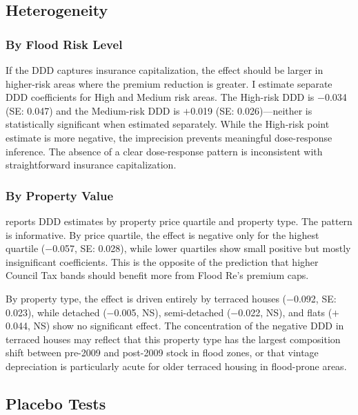\documentclass[12pt]{article}
\begin{document}
\subsection{Heterogeneity}

\subsubsection{By Flood Risk Level}

If the DDD captures insurance capitalization, the effect should be larger in higher-risk areas where the premium reduction is greater. I estimate separate DDD coefficients for High and Medium risk areas. The High-risk DDD is $-$0.034 (SE: 0.047) and the Medium-risk DDD is $+$0.019 (SE: 0.026)---neither is statistically significant when estimated separately. While the High-risk point estimate is more negative, the imprecision prevents meaningful dose-response inference. The absence of a clear dose-response pattern is inconsistent with straightforward insurance capitalization.

\subsubsection{By Property Value}



 reports DDD estimates by property price quartile and property type. The pattern is informative. By price quartile, the effect is negative only for the highest quartile ($-$0.057, SE: 0.028), while lower quartiles show small positive but mostly insignificant coefficients. This is the opposite of the prediction that higher Council Tax bands should benefit more from Flood Re's premium caps.

By property type, the effect is driven entirely by terraced houses ($-$0.092, SE: 0.023), while detached ($-$0.005, NS), semi-detached ($-$0.022, NS), and flats ($+$0.044, NS) show no significant effect. The concentration of the negative DDD in terraced houses may reflect that this property type has the largest composition shift between pre-2009 and post-2009 stock in flood zones, or that vintage depreciation is particularly acute for older terraced housing in flood-prone areas.

\subsection{Placebo Tests}
\label{subsec:placebo}
\end{document}
